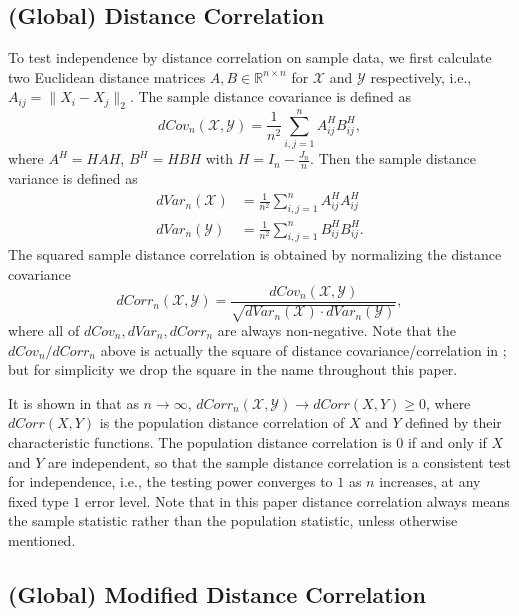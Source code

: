 \documentclass[11pt]{article}
\newcommand{\Real}{\mathbb{R}}
\begin{document}
\subsection{(Global) Distance Correlation}
\label{main1}


To test independence by distance correlation on sample data, we first calculate two Euclidean distance matrices $A, B \in \Real^{n \times n}$ for $\mathcal{X}$ and $\mathcal{Y}$ respectively, i.e., $A_{ij}=\|X_{i}-X_{j}\|_{2}$. The sample distance covariance is defined as
\begin{equation}
\label{dCovEqu}
dCov_{n}(\mathcal{X},\mathcal{Y})=\frac{1}{n^2}\sum_{i,j=1}^{n}A^{H}_{ij}B^{H}_{ij},
\end{equation}
where $A^{H}=HAH$, $B^{H}=HBH$ with $H=I_{n}-\frac{J_{n}}{n}$. Then the sample distance variance is defined as
\begin{align*}
dVar_{n}(\mathcal{X}) &=\frac{1}{n^2}\sum_{i,j=1}^{n}A^{H}_{ij}A^{H}_{ij}\\
dVar_{n}(\mathcal{Y}) &=\frac{1}{n^2}\sum_{i,j=1}^{n}B^{H}_{ij}B^{H}_{ij}.
\end{align*}
The squared sample distance correlation is obtained by normalizing the distance covariance
\begin{equation}
\label{dCorrEqu}
dCorr_{n}(\mathcal{X},\mathcal{Y})=\frac{dCov_{n}(\mathcal{X},\mathcal{Y})}{\sqrt{dVar_{n}(\mathcal{X}) \cdot dVar_{n}(\mathcal{Y})}},
\end{equation}
where all of $dCov_{n}, dVar_{n}, dCorr_{n}$ are always non-negative. Note that the $dCov_{n}/dCorr_{n}$ above is actually the square of distance covariance/correlation in \cite{SzekelyRizzoBakirov2007}; but for simplicity we drop the square in the name throughout this paper.

It is shown in \cite{SzekelyRizzoBakirov2007} that as $n \rightarrow \infty$, $dCorr_{n}(\mathcal{X},\mathcal{Y}) \rightarrow dCorr(X,Y) \geq 0$, where $dCorr(X,Y)$ is the population distance correlation of $X$ and $Y$ defined by their characteristic functions. The population distance correlation is $0$ if and only if $X$ and $Y$ are independent, so that the sample distance correlation is a consistent test for independence, i.e., the testing power converges to $1$ as $n$ increases, at any fixed type $1$ error level. Note that in this paper distance correlation always means the sample statistic rather than the population statistic, unless otherwise mentioned.

\subsection{(Global) Modified Distance Correlation}
\label{sec:gmd}
\end{document}
